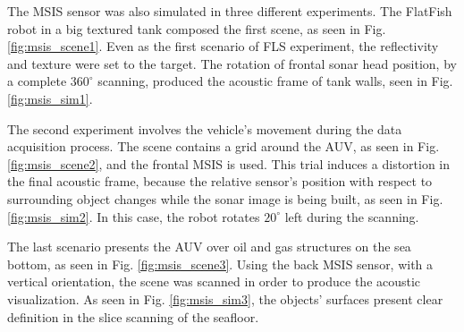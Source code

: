 \documentclass[final,5p,times]{elsarticle}
\begin{document}
The MSIS sensor was also simulated in three different experiments. The FlatFish robot in a big textured tank composed the first scene, as seen in Fig. \ref{fig:msis_scene1}. Even as the first scenario of FLS experiment, the reflectivity and texture were set to the target. The rotation of frontal sonar head position, by a complete $360^{\circ}$ scanning, produced the acoustic frame of tank walls, seen in Fig. \ref{fig:msis_sim1}.

The second experiment involves the vehicle's movement during the data acquisition process. The scene contains a grid around the AUV, as seen in Fig. \ref{fig:msis_scene2}, and the frontal MSIS is used. This trial induces a distortion in the final acoustic frame, because the relative sensor's position with respect to surrounding object changes while the sonar image is being built, as seen in Fig. \ref{fig:msis_sim2}. In this case, the robot rotates $20^{\circ}$ left during the scanning.

The last scenario presents the AUV over oil and gas structures on the sea bottom, as seen in Fig. \ref{fig:msis_scene3}. Using the back MSIS sensor, with a vertical orientation, the scene was scanned in order to produce the acoustic visualization. As seen in Fig. \ref{fig:msis_sim3}, the objects' surfaces present clear definition in the slice scanning of the seafloor.
\end{document}
